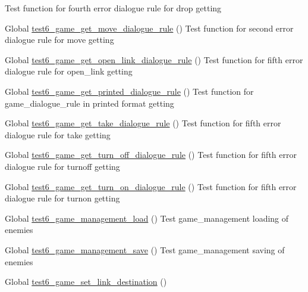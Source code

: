 \begin{DoxyRefList}
%
Test function for fourth error dialogue rule for drop getting  
\item[Global \mbox{\hyperlink{game__test_8c_afcec39ee67aa5da46bfefb1b29b7d4b2}{test6\+\_\+game\+\_\+get\+\_\+move\+\_\+dialogue\+\_\+rule}} ()]\label{test__test000329}%
%
Test function for second error dialogue rule for move getting  
\item[Global \mbox{\hyperlink{game__test_8c_a2518c86ef4b61b2cc5bfdccc58f89efc}{test6\+\_\+game\+\_\+get\+\_\+open\+\_\+link\+\_\+dialogue\+\_\+rule}} ()]\label{test__test000372}%
%
Test function for fifth error dialogue rule for open\+\_\+link getting  
\item[Global \mbox{\hyperlink{game__test_8c_a31e936b8d2b936c7075b6dc7900e4871}{test6\+\_\+game\+\_\+get\+\_\+printed\+\_\+dialogue\+\_\+rule}} ()]\label{test__test000316}%
%
Test function for game\+\_\+dialogue\+\_\+rule in printed format getting  
\item[Global \mbox{\hyperlink{game__test_8c_a725888b71bca9db469e67f87062e74ff}{test6\+\_\+game\+\_\+get\+\_\+take\+\_\+dialogue\+\_\+rule}} ()]\label{test__test000340}%
%
Test function for fifth error dialogue rule for take getting  
\item[Global \mbox{\hyperlink{game__test_8c_a9f7a39b270cb5f43162193586e11d5d3}{test6\+\_\+game\+\_\+get\+\_\+turn\+\_\+off\+\_\+dialogue\+\_\+rule}} ()]\label{test__test000366}%
%
Test function for fifth error dialogue rule for turnoff getting  
\item[Global \mbox{\hyperlink{game__test_8c_a71a9345e819a8972981a1d700d7d7800}{test6\+\_\+game\+\_\+get\+\_\+turn\+\_\+on\+\_\+dialogue\+\_\+rule}} ()]\label{test__test000360}%
%
Test function for fifth error dialogue rule for turnon getting  
\item[Global \mbox{\hyperlink{game__management__test_8c_ade83a811f02401e22f1364d428c72a57}{test6\+\_\+game\+\_\+management\+\_\+load}} ()]\label{test__test000114}%
%
Test game\+\_\+management loading of enemies  
\item[Global \mbox{\hyperlink{game__management__test_8c_a27d26d87caafb3f1422a5d92c9ab1ec9}{test6\+\_\+game\+\_\+management\+\_\+save}} ()]\label{test__test000128}%
%
Test game\+\_\+management saving of enemies  
\item[Global \mbox{\hyperlink{game__test_8c_af75e42e884496c2b52cc1c56479005d7}{test6\+\_\+game\+\_\+set\+\_\+link\+\_\+destination}} ()]\label{test__test000254}%

\end{DoxyRefList}
